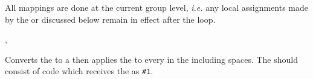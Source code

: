 \documentclass[oneside]{book}
\begin{document}
All mappings are done at the current group level, \emph{i.e.} any
local assignments made by the  or  discussed
below remain in effect after the loop.


\begin{function}{\strMapInline,\strVarMapInline}
\begin{syntax}
  
  
\end{syntax}
Converts the  to a  then
applies the  to every  in the
 including spaces.
The  should consist of code which
receives the  as \verb|#1|.
\begin{demohigh}
\IgnoreSpacesOn
\strClear \lTmpaStr
{} {
  \strPutRight \lTmpaStr {[#1]}
}
\strUse \lTmpaStr
\IgnoreSpacesOff
\end{demohigh}
\end{function}

\end{document}
